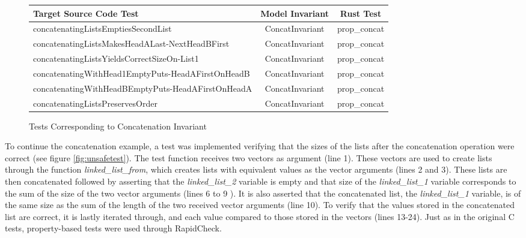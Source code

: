 \begin{figure}[H]
 \vspace{12pt}
\begin{center}
 \begin{tabularx}{\textwidth}{||X|c|c||}
 \hline
 Target Source Code Test & Model Invariant & Rust Test\\ [0.5ex] 
 \hline\hline
  concatenatingListsEmptiesSecondList & ConcatInvariant & prop\_concat \\ \hline
  concatenatingListsMakesHeadALast-NextHeadBFirst & ConcatInvariant & prop\_concat \\ \hline 
  concatenatingListsYieldsCorrectSizeOn-List1 & ConcatInvariant & prop\_concat \\ \hline
  concatenatingWithHead1EmptyPuts-HeadAFirstOnHeadB & ConcatInvariant & prop\_concat \\ \hline
  concatenatingWithHeadBEmptyPuts-HeadAFirstOnHeadA & ConcatInvariant & prop\_concat \\ \hline
  concatenatingListsPreservesOrder & ConcatInvariant & prop\_concat \\ 
 \hline
\end{tabularx}
\end{center}
    \caption{Tests Corresponding to Concatenation Invariant}
    \label{fig:correspond}
\end{figure}

To continue the concatenation example, a test was implemented verifying that the sizes of the lists after the concatenation operation were correct (see figure \ref{fig:unsafetest}). The test function receives two vectors as argument (line 1). These vectors are used to create lists through the function \textit{linked\_list\_from}, which creates lists with equivalent values as the vector arguments (lines 2 and 3). These lists are then concatenated followed by asserting that the \textit{linked\_list\_2} variable is empty and that size of the \textit{linked\_list\_1} variable corresponds to the sum of the size of the two vector arguments (lines 6 to 9 ). It is also asserted that the concatenated list, the \textit{linked\_list\_1} variable, is of the same size as the sum of the length of the two received vector arguments (line 10). To verify that the values stored in the concatenated list are correct, it is lastly iterated through, and each value compared to those stored in the vectors (lines 13-24). Just as in the original C tests, property-based tests were used through RapidCheck.


